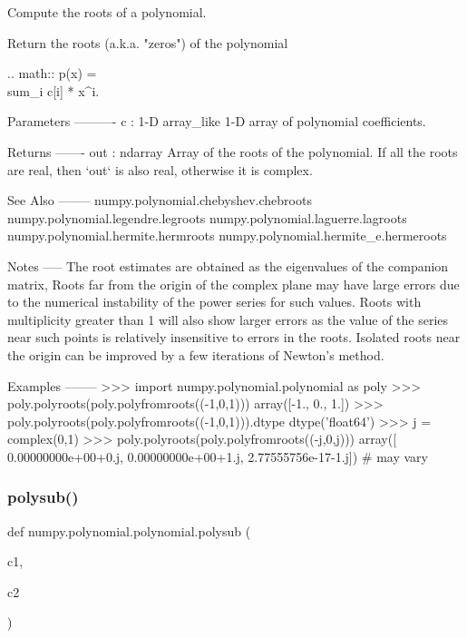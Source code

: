 \begin{DoxyVerb}Compute the roots of a polynomial.

Return the roots (a.k.a. "zeros") of the polynomial

.. math:: p(x) = \\sum_i c[i] * x^i.

Parameters
----------
c : 1-D array_like
    1-D array of polynomial coefficients.

Returns
-------
out : ndarray
    Array of the roots of the polynomial. If all the roots are real,
    then `out` is also real, otherwise it is complex.

See Also
--------
numpy.polynomial.chebyshev.chebroots
numpy.polynomial.legendre.legroots
numpy.polynomial.laguerre.lagroots
numpy.polynomial.hermite.hermroots
numpy.polynomial.hermite_e.hermeroots

Notes
-----
The root estimates are obtained as the eigenvalues of the companion
matrix, Roots far from the origin of the complex plane may have large
errors due to the numerical instability of the power series for such
values. Roots with multiplicity greater than 1 will also show larger
errors as the value of the series near such points is relatively
insensitive to errors in the roots. Isolated roots near the origin can
be improved by a few iterations of Newton's method.

Examples
--------
>>> import numpy.polynomial.polynomial as poly
>>> poly.polyroots(poly.polyfromroots((-1,0,1)))
array([-1.,  0.,  1.])
>>> poly.polyroots(poly.polyfromroots((-1,0,1))).dtype
dtype('float64')
>>> j = complex(0,1)
>>> poly.polyroots(poly.polyfromroots((-j,0,j)))
array([  0.00000000e+00+0.j,   0.00000000e+00+1.j,   2.77555756e-17-1.j]) # may vary\end{DoxyVerb}
 \mbox{\label{namespacenumpy_1_1polynomial_1_1polynomial_a933fc5794192da3624428289a5bf225a}} 
\subsubsection{\texorpdfstring{polysub()}{polysub()}}
{\footnotesize\ttfamily def numpy.\+polynomial.\+polynomial.\+polysub (\begin{DoxyParamCaption}\item[{}]{c1,  }\item[{}]{c2 }\end{DoxyParamCaption})}

